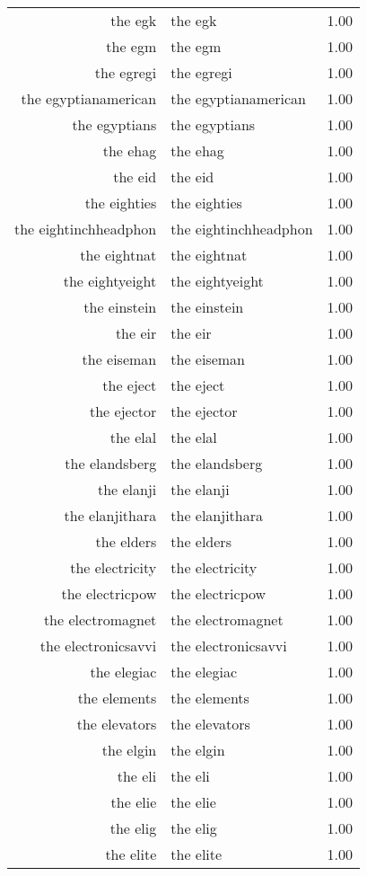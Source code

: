 \begin{table}[ht]
\begin{tabular}{rlr}
  the egk & the egk & 1.00 \\ 
  the egm & the egm & 1.00 \\ 
  the egregi & the egregi & 1.00 \\ 
  the egyptianamerican & the egyptianamerican & 1.00 \\ 
  the egyptians & the egyptians & 1.00 \\ 
  the ehag & the ehag & 1.00 \\ 
  the eid & the eid & 1.00 \\ 
  the eighties & the eighties & 1.00 \\ 
  the eightinchheadphon & the eightinchheadphon & 1.00 \\ 
  the eightnat & the eightnat & 1.00 \\ 
  the eightyeight & the eightyeight & 1.00 \\ 
  the einstein & the einstein & 1.00 \\ 
  the eir & the eir & 1.00 \\ 
  the eiseman & the eiseman & 1.00 \\ 
  the eject & the eject & 1.00 \\ 
  the ejector & the ejector & 1.00 \\ 
  the elal & the elal & 1.00 \\ 
  the elandsberg & the elandsberg & 1.00 \\ 
  the elanji & the elanji & 1.00 \\ 
  the elanjithara & the elanjithara & 1.00 \\ 
  the elders & the elders & 1.00 \\ 
  the electricity & the electricity & 1.00 \\ 
  the electricpow & the electricpow & 1.00 \\ 
  the electromagnet & the electromagnet & 1.00 \\ 
  the electronicsavvi & the electronicsavvi & 1.00 \\ 
  the elegiac & the elegiac & 1.00 \\ 
  the elements & the elements & 1.00 \\ 
  the elevators & the elevators & 1.00 \\ 
  the elgin & the elgin & 1.00 \\ 
  the eli & the eli & 1.00 \\ 
  the elie & the elie & 1.00 \\ 
  the elig & the elig & 1.00 \\ 
  the elite & the elite & 1.00 \\ 

\end{tabular}
\end{table}
